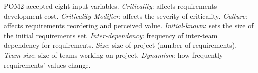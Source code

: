 POM2 accepted eight input variables.  \textit{Criticality}: affects 
requirements development cost.  \textit{Criticality Modifier}: affects 
the severity of criticality. \textit{Culture}: affects requirements 
reordering and perceived value.  \textit{Initial-known}: sets the
size of the initial requirements set.  \textit{Inter-dependency}: 
frequency of inter-team dependency for requirements.  \textit{Size}: 
size of project (number of requirements).  \textit{Team size}: size of teams 
working on project.  \textit{Dynamism}: how frequently requirements' values 
change.
